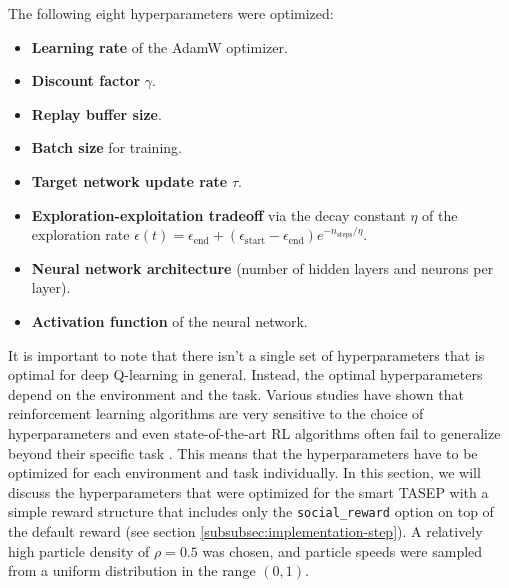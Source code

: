 The following eight hyperparameters were optimized:
\begin{itemize}
    \item \textbf{Learning rate} of the AdamW optimizer.
    \item \textbf{Discount factor} $\gamma$.
    \item \textbf{Replay buffer size}.
    \item \textbf{Batch size} for training.
    \item \textbf{Target network update rate} $\tau$.
    \item \textbf{Exploration-exploitation tradeoff} via the decay constant $\eta$ of the exploration rate $\epsilon(t)=\epsilon_{\text{end}} + (\epsilon_{\text{start}} - \epsilon_{\text{end}}) e^{-n_{\text{steps}}/\eta}$.
    \item \textbf{Neural network architecture} (number of hidden layers and neurons per layer).
    \item \textbf{Activation function} of the neural network.
\end{itemize}
It is important to note that there isn't a single set of hyperparameters that is optimal for deep Q-learning in general. Instead, the optimal hyperparameters depend on the environment and the task. Various studies have shown that reinforcement learning algorithms are very sensitive to the choice of hyperparameters and even state-of-the-art RL algorithms often fail to generalize beyond their specific task \cite{parker-holder_automated_2022,henderson_deep_2019,engstrom_implementation_2020,andrychowicz_what_2020}. This means that the hyperparameters have to be optimized for each environment and task individually. In this section, we will discuss the hyperparameters that were optimized for the smart TASEP with a simple reward structure that includes only the \texttt{social\_reward} option on top of the default reward (see section \ref{subsubsec:implementation-step}). A relatively high particle density of $\rho=0.5$ was chosen, and particle speeds were sampled from a uniform distribution in the range $(0, 1)$.


